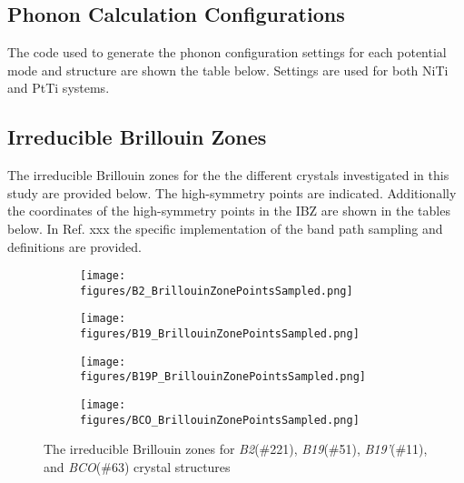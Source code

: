 \documentclass[preprint,colorlinks=true,linkcolor=black,citecolor=black]{elsarticle}
\begin{document}
\subsection{Phonon Calculation Configurations}
\label{sec:phonon_calc_config}

The code used to generate the phonon configuration settings for each
potential mode and structure are shown the table below. Settings are
used for both NiTi and PtTi systems.


\subsection{Irreducible Brillouin Zones}
\label{sec:appx_ibz}

The irreducible Brillouin zones for the the different crystals
investigated in this study are provided below. The high-symmetry
points are indicated. Additionally the coordinates of the
high-symmetry points in the IBZ are shown in the tables below. In
Ref. xxx the specific implementation of the band path sampling and
definitions are provided.

\begin{figure}[!htp]
	\centering
	\begin{subfigure}[b]{0.45\linewidth}
		\texttt{[image: figures/B2\_BrillouinZonePointsSampled.png]}
		\caption{}
		\label{fig:B2}
	\end{subfigure}
	\hfill
	\begin{subfigure}[b]{0.45\linewidth}
		\texttt{[image: figures/B19\_BrillouinZonePointsSampled.png]}
		\caption{}
		\label{fig:B19}
	\end{subfigure}
	\vspace{1mm}
	\begin{subfigure}[b]{0.45\linewidth}
		\texttt{[image: figures/B19P\_BrillouinZonePointsSampled.png]}
		\caption{}
		\label{fig:B19P}
	\end{subfigure}
	\hfill
	\begin{subfigure}[b]{0.45\linewidth}
		\texttt{[image: figures/BCO\_BrillouinZonePointsSampled.png]}
		\caption{}
		\label{fig:BCO}
	\end{subfigure}
	\caption{The irreducible Brillouin zones for \textit{B2}(\#221),
		\textit{B19}(\#51), \textit{B19'}(\#11), and \textit{BCO}(\#63)
		crystal structures}
	\label{fig:ibz}
\end{figure}

\pagebreak

\end{document}
